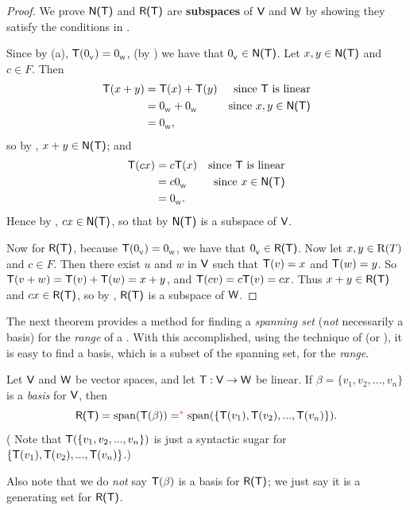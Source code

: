 \begin{proof}
We prove \(\textsf{N(T)}\) and \(\textsf{R(T)}\) are \textbf{subspaces} of \(\textsf{V}\) and \(\textsf{W}\) by showing they satisfy the conditions in .

Since by (a), \(\textsf{T}(0_{_{\textsf{V}}}) = 0_{_{\textsf{W}}}\), (by ) we have that \(0_{_{\textsf{V}}} \in \textsf{N(T)}\).
Let \(x, y \in \textsf{N(T)}\) and \(c \in F\).
Then
\begin{align*}
    \textsf{T}(x + y) & = \textsf{T}(x) + \textsf{T}(y) & \text{since \(\textsf{T}\) is linear} \\
              & = 0_{_{\textsf{W}}} + 0_{_{\textsf{W}}} & \text{since \(x, y \in \textsf{N(T)}\)} \\
              & = 0_{_{\textsf{W}}},
\end{align*}
so by , \(x + y \in \textsf{N(T)}\);
and
\begin{align*}
    \textsf{T}(cx) & = c \textsf{T}(x) & \text{since \(\textsf{T}\) is linear} \\
           & = c 0_{_{\textsf{W}}} & \text{since \(x \in \textsf{N(T)}\)} \\
           & = 0_{_{\textsf{W}}}.
\end{align*}
Hence by , \(cx \in \textsf{N(T)}\), so that by  \(\textsf{N(T)}\) is a subspace of \(\textsf{V}\).

Now for \(\textsf{R(T)}\), because \(\textsf{T}(0_{_{\textsf{V}}}) = 0_{_{\textsf{W}}}\), we have that \(0_{_{\textsf{V}}} \in \textsf{R(T)}\).
Now let \(x, y \in \mathrm{R}(T)\) and \(c \in F\).
Then there exist \(u\) and \(w\) in \(\textsf{V}\) such that \(\textsf{T}(v) = x\) and \(\textsf{T}(w) = y\).
So \(\textsf{T}(v + w) = \textsf{T}(v) + \textsf{T}(w) = x + y\), and \(\textsf{T}(cv) = c\textsf{T}(v) = cx\). Thus \(x + y \in \textsf{R(T)}\) and \(cx \in \textsf{R(T)}\), so by , \(\textsf{R(T)}\) is a subspace of \(\textsf{W}\).
\end{proof}

The next theorem provides a method for finding a \emph{spanning set} (\emph{not} necessarily a basis) for the \emph{range} of a \LTRAN{}.
With this accomplished, using the technique of  (or ), it is easy to find a basis, which is a subset of the spanning set, for the \emph{range}.

\begin{theorem} \label{thm 2.2}
Let \(\textsf{V}\) and \(\textsf{W}\) be vector spaces, and let \(\textsf{T} : \textsf{V} \to \textsf{W}\) be linear.
If \(\beta = \{ v_1, v_2 , ..., v_n \}\) is a \emph{basis} for \(\textsf{V}\), then
\[
    \RANGET = \spann(\T(\beta)) =^{\RED{*}} \spann(\{ \T(v_1), \T(v_2), ..., \T(v_n) \}).
\]
(\RED{*} Note that \(\textsf{T}(\{ v_1, v_2 , ..., v_n \})\) is just a syntactic sugar for \(\{ \textsf{T}(v_1), \textsf{T}(v_2), ..., \textsf{T}(v_n) \}\).)

Also note that we do \emph{not} say \(\textsf{T}(\beta)\) is a basis for \(\textsf{R(T)}\);
we just say it is a generating set for \(\textsf{R(T)}\).
\end{theorem}

